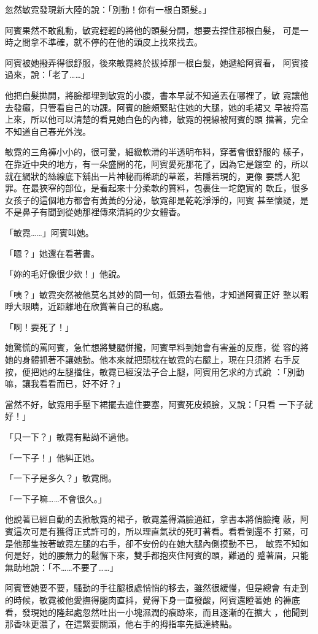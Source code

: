 忽然敏霓發現新大陸的說：「別動！你有一根白頭髮。」

阿賓果然不敢亂動，敏霓輕輕的將他的頭髮分開，想要去捏住那根白髮，
可是一時之間拿不準確，就不停的在他的頭皮上找來找去。

阿賓被她撥弄得很舒服，後來敏霓終於拔掉那一根白髮，她遞給阿賓看，
阿賓接過來，說：「老了……」

他把白髮拋開，將臉都埋到敏霓的小腹，書本早就不知道丟在哪裡了，敏
霓讓他去發癲，只管看自己的功課。阿賓的臉頰緊貼住她的大腿，她的毛裙又
早被捋高上來，所以他可以清楚的看見她白色的內褲，敏霓的視線被阿賓的頭
擋著，完全不知道自己春光外洩。

敏霓的三角褲小小的，很可愛，細緻軟滑的半透明布料，穿著會很舒服的
樣子，在靠近中央的地方，有一朵盛開的花，阿賓愛死那花了，因為它是鏤空
的，所以就在網狀的絲線底下舖出一片神秘而稀疏的草叢，若隱若現的，更像
要誘人犯罪。在最狹窄的部位，是看起來十分柔軟的質料，包裹住一坨飽實的
軟丘，很多女孩子的這個地方都會有黃黃的分泌，敏霓卻是乾乾淨淨的，阿賓
甚至懷疑，是不是鼻子有聞到從她那裡傳來清純的少女體香。

「敏霓……」阿賓叫她。

「嗯？」她還在看著書。

「妳的毛好像很少欸！」他說。

「咦？」敏霓突然被他莫名其妙的問一句，低頭去看他，才知道阿賓正好
整以暇睜大眼睛，近距離地在欣賞著自己的私處。

「啊！要死了！」

她驚慌的罵阿賓，急忙想將雙腿併攏，阿賓早料到她會有害羞的反應，從
容的將她的身體抓著不讓她動。他本來就把頭枕在敏霓的右腿上，現在只須將
右手反按，便把她的左腿擋住，敏霓已經沒法子合上腿，阿賓用乞求的方式說
：「別動嘛，讓我看看而已，好不好？」

當然不好，敏霓用手壓下裙擺去遮住要塞，阿賓死皮賴臉，又說：「只看
一下子就好！」

「只一下？」敏霓有點詏不過他。

「一下子！」他糾正她。

「一下子是多久？」敏霓問。

「一下子嘛……不會很久。」

他說著已經自動的去掀敏霓的裙子，敏霓羞得滿臉通紅，拿書本將俏臉掩
蔽，阿賓這次可是有獲得正式許可的，所以理直氣狀的死盯著看。看看倒還不
打緊，可是他那隻按著敏霓左腿的右手，卻不安份的在她大腿內側摸動不已，
敏霓不知如何是好，她的腰無力的鬆懈下來，雙手都抱夾住阿賓的頭，難過的
蹙著眉，只能無助地說：「不……不要了……」

阿賓管她要不要，騷動的手往腿根處悄悄的移去，雖然很緩慢，但是總會
有走到的時候，敏霓被他愛撫得腿肉直抖，覺得下身一直發酸，阿賓還瞪著她
的褲底看，發現她的隆起處忽然吐出一小塊濕潤的痕跡來，而且逐漸的在擴大
，他聞到那香味更濃了，在這緊要關頭，他右手的拇指率先抵達終點。

